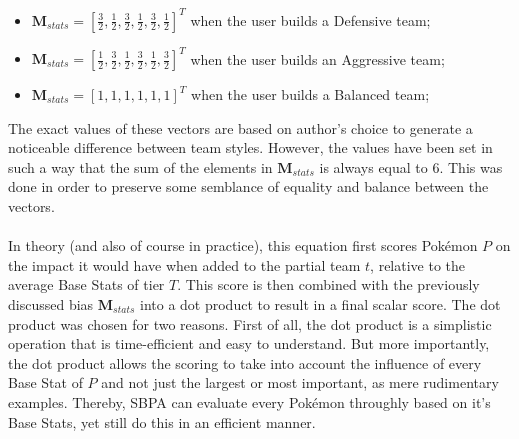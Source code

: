 \documentclass{article}
\begin{document}
\begin{itemize}
	\item $\textbf{M}_{stats}=[\frac{3}{2},\frac{1}{2},\frac{3}{2},\frac{1}{2},\frac{3}{2},\frac{1}{2}]^T$ when the user builds a Defensive team;
	\item $\textbf{M}_{stats}=[\frac{1}{2},\frac{3}{2},\frac{1}{2},\frac{3}{2},\frac{1}{2},\frac{3}{2}]^T$ when the user builds an Aggressive team;
	\item $\textbf{M}_{stats}=[1,1,1,1,1,1]^T$ when the user builds a Balanced team;
\end{itemize}
The exact values of these vectors are based on author's choice to generate a noticeable difference between team styles. However, the values have been set in such a way that the sum of the elements in $\textbf{M}_{stats}$ is always equal to 6. This was done in order to preserve some semblance of equality and balance between the vectors.\\\\
In theory (and also of course in practice), this equation first scores Pok\'emon $P$ on the impact it would have when added to the partial team $t$, relative to the average Base Stats of tier $T$. This score is then combined with the previously discussed bias $\textbf{M}_{stats}$ into a dot product to result in a final scalar score. The dot product was chosen for two reasons. First of all, the dot product is a simplistic operation that is time-efficient and easy to understand. But more importantly, the dot product allows the scoring to take into account the influence of every Base Stat of $P$ and not just the largest or most important, as mere rudimentary examples. Thereby, SBPA can evaluate every Pok\'emon throughly based on it's Base Stats, yet still do this in an efficient manner.
\end{document}
